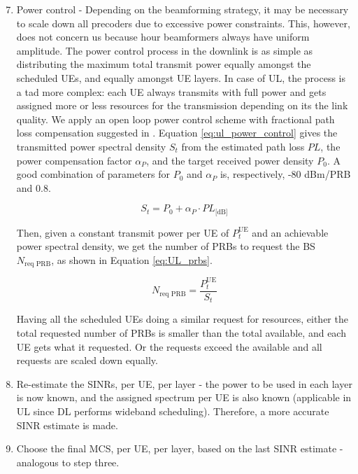 \begin{enumerate} \setcounter{enumi}{6}
    \item Power control - Depending on the beamforming strategy, it may be necessary to scale down all precoders due to excessive power constraints. This, however, does not concern us because hour beamformers always have uniform amplitude. The power control process in the downlink is as simple as distributing the maximum total transmit power equally amongst the scheduled UEs, and equally amongst UE layers. In case of UL, the process is a tad more complex: each UE always transmits with full power and gets assigned more or less resources for the transmission depending on its the link quality. We apply an open loop power control scheme with fractional path loss compensation suggested in \cite{ul_power_control}. Equation \eqref{eq:ul_power_control} gives the transmitted power spectral density $S_t$ from the estimated path loss $PL$, the power compensation factor $\alpha_P$, and the target received power density $P_0$. A good combination of parameters for $P_0$ and $\alpha_P$ is, respectively, -80 dBm/PRB and 0.8.
    
    \begin{equation} \label{eq:ul_power_control}
        S_t = P_0 + \alpha_P \cdot PL_\text{[dB]}
    \end{equation}


    Then, given a constant transmit power per UE of $P_t^\text{UE}$ and an achievable power spectral density, we get the number of PRBs to request the BS $N_\text{req PRB}$, as shown in Equation \eqref{eq:UL_prbs}.

    \begin{equation} \label{eq:UL_prbs}
        N_\text{req PRB} = \frac{P_t^\text{UE}}{S_t} 
    \end{equation}

    Having all the scheduled UEs doing a similar request for resources, either the total requested number of PRBs is smaller than the total available, and each UE gets what it requested. Or the requests exceed the available and all requests are scaled down equally.


    \item Re-estimate the \acsp{SINR}, per \ac{UE}, per layer - the power to be used in each layer is now known, and the assigned spectrum per UE is also known (applicable in UL since DL performs wideband scheduling). Therefore, a more accurate SINR estimate is made.
    
    \item Choose the final MCS, per UE, per layer, based on the last SINR estimate - analogous to step three. 
\end{enumerate}


